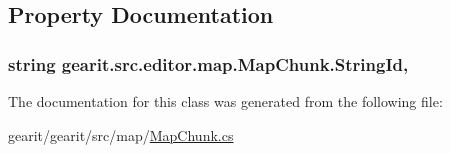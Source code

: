 \subsection{Property Documentation}
\hypertarget{classgearit_1_1src_1_1editor_1_1map_1_1_map_chunk_ad9d6f2c5ffd94987364e86f932e6df92}{
\subsubsection[{String\+Id}]{\setlength{\rightskip}{0pt plus 5cm}string gearit.\+src.\+editor.\+map.\+Map\+Chunk.\+String\+Id\hspace{0.3cm}{\ttfamily [get]}, {\ttfamily [set]}}}\label{classgearit_1_1src_1_1editor_1_1map_1_1_map_chunk_ad9d6f2c5ffd94987364e86f932e6df92}


The documentation for this class was generated from the following file\+:\begin{DoxyCompactItemize}
\item 
gearit/gearit/src/map/\hyperlink{_map_chunk_8cs}{Map\+Chunk.\+cs}\end{DoxyCompactItemize}
